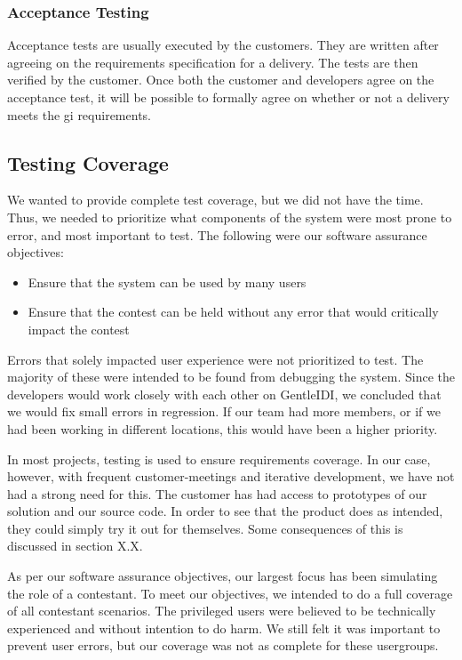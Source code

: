\subsubsection{Acceptance Testing}
Acceptance tests are usually executed by the customers. They are written
after agreeing on the requirements specification for a delivery. The
tests are then verified by the customer. Once both the customer and
developers agree on the acceptance test, it will be possible to
formally agree on whether or not a delivery meets the gi\ven
requirements.

\subsection{Testing Coverage}
We wanted to provide complete test coverage, but we did not have the
time. Thus, we needed to prioritize what components of the system were
most prone to error, and most important to test. The following were our
software assurance objectives:
\liststyleLSii
\begin{itemize}
    \item Ensure that the system can be used by many users
    \item Ensure that the contest can be held without any error that would
critically impact the contest
\end{itemize}

Errors that solely impacted user experience were not prioritized to
test. The majority of these were intended to be found from debugging
the system. Since the developers would work closely with each other on
GentleIDI, we concluded that we would fix small errors in regression.
If our team had more members, or if we had been working in different
locations, this would have been a higher priority.

In most projects, testing is used to ensure requirements coverage. In
our case, however, with frequent customer-meetings and iterative
development, we have not had a strong need for this. The customer has
had access to prototypes of our solution and our source code. In order
to see that the product does as intended, they could simply try it out
for themselves. Some consequences of this is discussed in section X.X.

As per our software assurance objectives, our largest focus has been
simulating the role of a contestant. To meet our objectives, we
intended to do a full coverage of all contestant scenarios. The
privileged users were believed to be technically experienced and
without intention to do harm. We still felt it was important to prevent
user errors, but our coverage was not as complete for these
usergroups.


